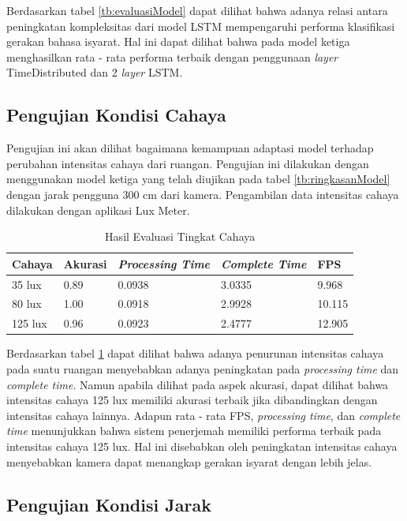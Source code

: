 Berdasarkan tabel \ref{tb:evaluasiModel} dapat dilihat bahwa adanya relasi antara peningkatan kompleksitas dari model LSTM mempengaruhi performa klasifikasi gerakan bahasa isyarat. Hal ini dapat dilihat bahwa pada model ketiga menghasilkan rata - rata performa terbaik dengan penggunaan \emph{layer} TimeDistributed dan 2 \emph{layer} LSTM.

\subsection{Pengujian Kondisi Cahaya}
\label{sec:analisiscahaya}

Pengujian ini akan dilihat bagaimana kemampuan adaptasi model terhadap perubahan intensitas cahaya dari ruangan. Pengujian ini dilakukan dengan menggunakan model ketiga yang telah diujikan pada tabel \ref{tb:ringkasanModel} dengan jarak pengguna 300 cm dari kamera. Pengambilan data intensitas cahaya dilakukan dengan aplikasi Lux Meter.

\begin{table}[H]
  \caption{Hasil Evaluasi Tingkat Cahaya}
  \label{tb:evaluasiCahaya}
  \centering
  \begin{tabular}{lllll}
    \hline
    \textbf{Cahaya} & \textbf{Akurasi} & \emph{\textbf{Processing Time}} & \emph{\textbf{Complete Time}} & \textbf{FPS} \\
    \hline
    35 lux & 0.89 & 0.0938 & 3.0335   & 9.968\\
    80 lux & 1.00 & 0.0918 & 2.9928   & 10.115\\
    125 lux & 0.96 & 0.0923 & 2.4777  & 12.905\\
    \hline
  \end{tabular}
\end{table}

Berdasarkan tabel \ref{tb:evaluasiCahaya} dapat dilihat bahwa adanya penurunan intensitas cahaya pada suatu ruangan menyebabkan adanya peningkatan pada \emph{processing time} dan \emph{complete time}. Namun apabila dilihat pada aspek akurasi, dapat dilihat bahwa intensitas cahaya 125 lux memiliki akurasi terbaik jika dibandingkan dengan intensitas cahaya lainnya. Adapun rata - rata FPS, \emph{processing time}, dan \emph{complete time} menunjukkan bahwa sistem penerjemah memiliki performa terbaik pada intensitas cahaya 125 lux.  Hal ini disebabkan oleh peningkatan intensitas cahaya menyebabkan kamera dapat menangkap gerakan isyarat dengan lebih jelas.


\subsection{Pengujian Kondisi Jarak}
\label{sec:analisisjarak}

